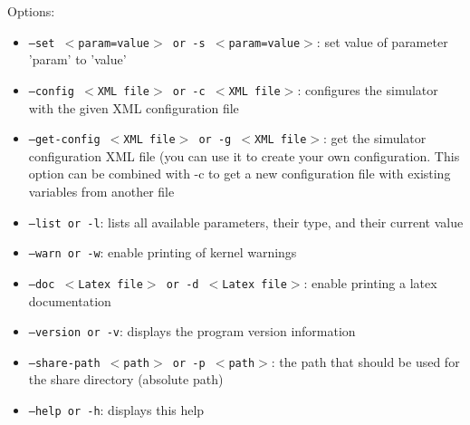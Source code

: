 \noindent Options:
\begin{itemize}
\item \texttt{--set $<$param=value$>$ or -s $<$param=value$>$}: set value of parameter 'param' to 'value'
\item \texttt{--config $<$XML file$>$ or -c $<$XML file$>$}: configures the simulator with the given XML configuration file
\item \texttt{--get-config $<$XML file$>$ or -g $<$XML file$>$}: get the simulator configuration XML file (you can use it to create your own configuration. This option can be combined with -c to get a new configuration file with existing variables from another file
\item \texttt{--list or -l}: lists all available parameters, their type, and their current value
\item \texttt{--warn or -w}: enable printing of kernel warnings
\item \texttt{--doc $<$Latex file$>$ or -d $<$Latex file$>$}: enable printing a latex documentation
\item \texttt{--version or -v}: displays the program version information
\item \texttt{--share-path $<$path$>$ or -p $<$path$>$}: the path that should be used for the share directory (absolute path)
\item \texttt{--help or -h}: displays this help
\end{itemize}
